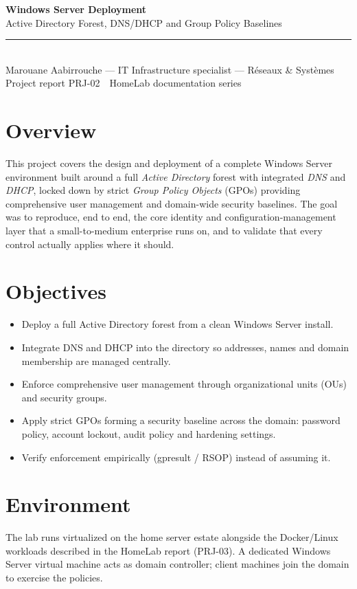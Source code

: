 \documentclass[11pt,a4paper]{article}
\begin{document}
\begin{center}
  {\LARGE\bfseries Windows Server Deployment}\\[4pt]
  {\large Active Directory Forest, DNS/DHCP and Group Policy Baselines}\\[8pt]
  {\color{noc}\rule{\textwidth}{1pt}}\\[6pt]
  {\small Marouane Aabirrouche --- IT Infrastructure specialist --- R\'eseaux \& Syst\`emes}\\
  {\small Project report PRJ-02 \,\textbullet\, HomeLab documentation series}
\end{center}

\section*{Overview}
This project covers the design and deployment of a complete Windows Server
environment built around a full \emph{Active Directory} forest with integrated
\emph{DNS} and \emph{DHCP}, locked down by strict \emph{Group Policy Objects}
(GPOs) providing comprehensive user management and domain-wide security
baselines. The goal was to reproduce, end to end, the core identity and
configuration-management layer that a small-to-medium enterprise runs on,
and to validate that every control actually applies where it should.

\section{Objectives}
\begin{itemize}[leftmargin=1.6em]
  \item Deploy a full Active Directory forest from a clean Windows Server install.
  \item Integrate DNS and DHCP into the directory so addresses, names and
        domain membership are managed centrally.
  \item Enforce comprehensive user management through organizational units (OUs)
        and security groups.
  \item Apply strict GPOs forming a security baseline across the domain:
        password policy, account lockout, audit policy and hardening settings.
  \item Verify enforcement empirically (gpresult / RSOP) instead of assuming it.
\end{itemize}

\section{Environment}
The lab runs virtualized on the home server estate alongside the Docker/Linux
workloads described in the HomeLab report (PRJ-03). A dedicated Windows Server
virtual machine acts as domain controller; client machines join the domain to
exercise the policies.
\end{document}
